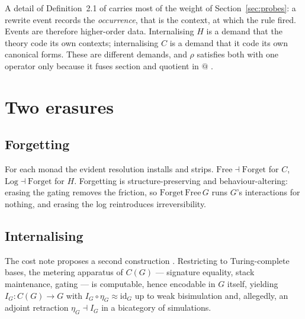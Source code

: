 \documentclass[11pt,a4paper]{article}
\theoremstyle{definition}
\theoremstyle{plain}
\theoremstyle{remark}
\newcommand{\rhoc}{\rho}
\newcommand{\id}{\mathrm{id}}
\begin{document}
A detail of Definition~2.1 of \cite{history} carries most of the weight of
Section~\ref{sec:probes}: a rewrite event records the \emph{occurrence}, that is the context, at
which the rule fired. Events are therefore higher-order data. Internalising $H$ is a demand that the
theory code its own contexts; internalising $C$ is a demand that it code its own canonical forms.
These are different demands, and $\rhoc$ satisfies both with one operator only because it fuses
section and quotient in $@$ \cite[\S5]{cost}.

\section{Two erasures}
\label{sec:erasures}

\subsection{Forgetting}

For each monad the evident resolution installs and strips. $\mathrm{Free} \dashv \mathrm{Forget}$
for $C$, $\mathrm{Log} \dashv \mathrm{Forget}$ for $H$. Forgetting is structure-preserving and
behaviour-altering: erasing the gating removes the friction, so $\mathrm{Forget}\,\mathrm{Free}\,G$
runs $G$'s interactions for nothing, and erasing the log reintroduces irreversibility.

\subsection{Internalising}

The cost note proposes a second construction \cite[\S9.3]{cost}. Restricting to Turing-complete
bases, the metering apparatus of $C(G)$ --- signature equality, stack maintenance, gating --- is
computable, hence encodable in $G$ itself, yielding $I_G : C(G) \to G$ with
$I_G \circ \eta_G \approx \id_G$ up to weak bisimulation and, allegedly, an adjoint retraction
$\eta_G \dashv I_G$ in a bicategory of simulations.
\end{document}
